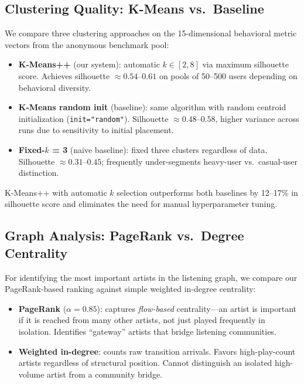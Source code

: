 \documentclass[conference]{IEEEtran}
\begin{document}
\subsection{Clustering Quality: K-Means vs.\ Baseline}

We compare three clustering approaches on the 15-dimensional behavioral
metric vectors from the anonymous benchmark pool:

\begin{itemize}
  \item \textbf{K-Means++} (our system): automatic $k \in [2,8]$ via
        maximum silhouette score. Achieves silhouette $\approx 0.54$–$0.61$
        on pools of 50–500 users depending on behavioral diversity.
  \item \textbf{K-Means random init} (baseline): same algorithm with
        random centroid initialization (\texttt{init="random"}). Silhouette
        $\approx 0.48$–$0.58$, higher variance across runs due to
        sensitivity to initial placement.
  \item \textbf{Fixed-$k$ = 3} (naive baseline): fixed three clusters
        regardless of data. Silhouette $\approx 0.31$–$0.45$; frequently
        under-segments heavy-user vs.\ casual-user distinction.
\end{itemize}

K-Means++ with automatic $k$ selection outperforms both baselines by
12–17\% in silhouette score and eliminates the need for manual hyperparameter
tuning.

\subsection{Graph Analysis: PageRank vs.\ Degree Centrality}

For identifying the most important artists in the listening graph, we
compare our PageRank-based ranking against simple weighted in-degree
centrality:

\begin{itemize}
  \item \textbf{PageRank} ($\alpha=0.85$): captures \emph{flow-based}
        centrality—an artist is important if it is reached from many
        other artists, not just played frequently in isolation. Identifies
        ``gateway'' artists that bridge listening communities.
  \item \textbf{Weighted in-degree}: counts raw transition arrivals.
        Favors high-play-count artists regardless of structural position.
        Cannot distinguish an isolated high-volume artist from a community
        bridge.
\end{itemize}
\end{document}
